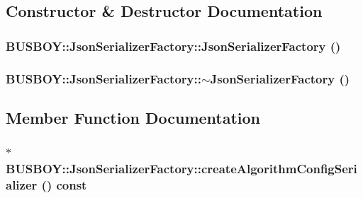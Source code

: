 \subsection{Constructor \& Destructor Documentation}
\hypertarget{classBUSBOY_1_1JsonSerializerFactory_aebb40b1fcb1c98099f7d2836fc0e8192}{
\subsubsection[{JsonSerializerFactory}]{\setlength{\rightskip}{0pt plus 5cm}BUSBOY::JsonSerializerFactory::JsonSerializerFactory ()}}
\label{classBUSBOY_1_1JsonSerializerFactory_aebb40b1fcb1c98099f7d2836fc0e8192}
\hypertarget{classBUSBOY_1_1JsonSerializerFactory_ab1a476923261a86ad9536cebfc8a4c0e}{
\subsubsection[{$\sim$JsonSerializerFactory}]{\setlength{\rightskip}{0pt plus 5cm}BUSBOY::JsonSerializerFactory::$\sim$JsonSerializerFactory ()}}
\label{classBUSBOY_1_1JsonSerializerFactory_ab1a476923261a86ad9536cebfc8a4c0e}


\subsection{Member Function Documentation}
\hypertarget{classBUSBOY_1_1JsonSerializerFactory_a54d006f2e2a308e12ce60a418cea0436}{
\subsubsection[{createAlgorithmConfigSerializer}]{ $\ast$ BUSBOY::JsonSerializerFactory::createAlgorithmConfigSerializer () const}}
\label{classBUSBOY_1_1JsonSerializerFactory_a54d006f2e2a308e12ce60a418cea0436}


